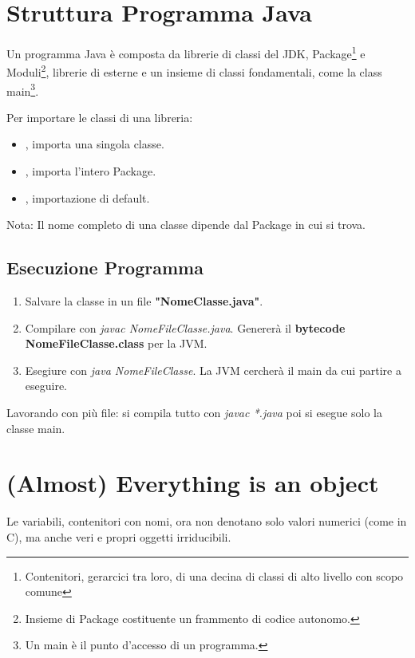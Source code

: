 \section{Struttura Programma Java}
Un programma Java è composta da librerie di classi del JDK, Package\footnote{Contenitori, gerarcici tra loro, di una decina di classi di alto livello con scopo comune} e Moduli\footnote{Insieme di Package costituente un frammento di codice autonomo.}, librerie di esterne e un insieme di classi fondamentali, come la class main\footnote{Un main è il punto d'accesso di un programma.}.

Per importare le classi di una libreria:
\begin{itemize}
	\item {}, importa una singola classe.
	\item {}, importa l'intero Package.
	\item {}, importazione di default.
\end{itemize}

Nota: Il nome completo di una classe dipende dal Package in cui si trova.

\subsection{Esecuzione Programma}
\begin{enumerate}
	\item Salvare la classe in un file \textbf{"NomeClasse.java"}.
	\item Compilare con \textit{javac NomeFileClasse.java}. Genererà il \textbf{bytecode NomeFileClasse.class} per la JVM.
	\item Esegiure con \textit{java NomeFileClasse}. La JVM cercherà il main da cui partire a eseguire.
\end{enumerate}

Lavorando con più file: si compila tutto con \textit{javac *.java} poi si esegue solo la classe main.





\section{(Almost) Everything is an object}
Le variabili, contenitori con nomi, ora non denotano solo valori numerici (come in C), ma anche veri e propri oggetti irriducibili.

